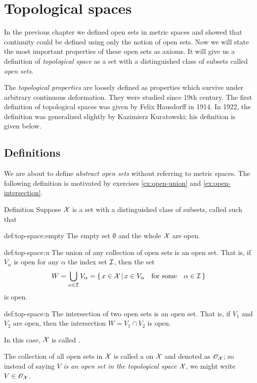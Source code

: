\chapter{Topological spaces}


In the previous chapter we defined open sets in metric spaces 
and showed that continuity could be defined using only the notion of open sets.
Now we will state the most important properties of these open sets as axioms.
It will give us a definition of \emph{topological space} as a set with a distinguished class of subsets called \emph{open sets}.

The \emph{topological properties} are loosely defined as properties which survive under arbitrary continuous deformation.
They were studied since 19th century.
The first definition of topological spaces was given by Felix Hausdorff in 1914.
In 1922, the definition was generalized slightly by Kazimierz Kuratowski; his definition is given below.

\section{Definitions}

We are about to define \emph{abstract open sets} without referring to metric spaces.
The following definition is motivated by exercises \ref{ex:open-union} and \ref{ex:open-intersection}.

\begin{thm}{Definition}\label{def:top-space}
Suppose $\mathcal{X}$ is a set 
with a distinguished class of subsets, called  such that

\begin{subthm}{def:top-space:empty}
The empty set $\emptyset$ and the whole $\mathcal{X}$ are open.
\end{subthm}

\begin{subthm}{def:top-space:u}
The union of any collection of open sets is an open set.
That is, if $V_\alpha$ is open for any $\alpha$ the index set $\mathcal{I}$, 
then the set
\[W=\bigcup_{\alpha\in \mathcal{I}} V_\alpha
=
\left\{\,{x\in \mathcal{X}}\,\middle|\,{x\in V_\alpha\quad\text{for some}\quad\alpha\in \mathcal{I}}\,\right\}\]
is open.
\end{subthm}

\begin{subthm}{def:top-space:n}
The intersection of two open sets is an open set.  
That is, if $V_1$ and $V_2$ are open, then the intersection $W=V_1 \cap V_2$ is open. 
\end{subthm}

In this case, $\mathcal{X}$ is called .

The collection of all open sets in  $\mathcal{X}$ is called a  on $\mathcal{X}$ and denoted as $\mathscr{O}_{\mathcal{X}}$;
so instead of saying \emph{$V$ is an open set in the topological space $\mathcal{X}$}, we might write $V\in \mathscr{O}_{\mathcal{X}}$.
\end{thm}

